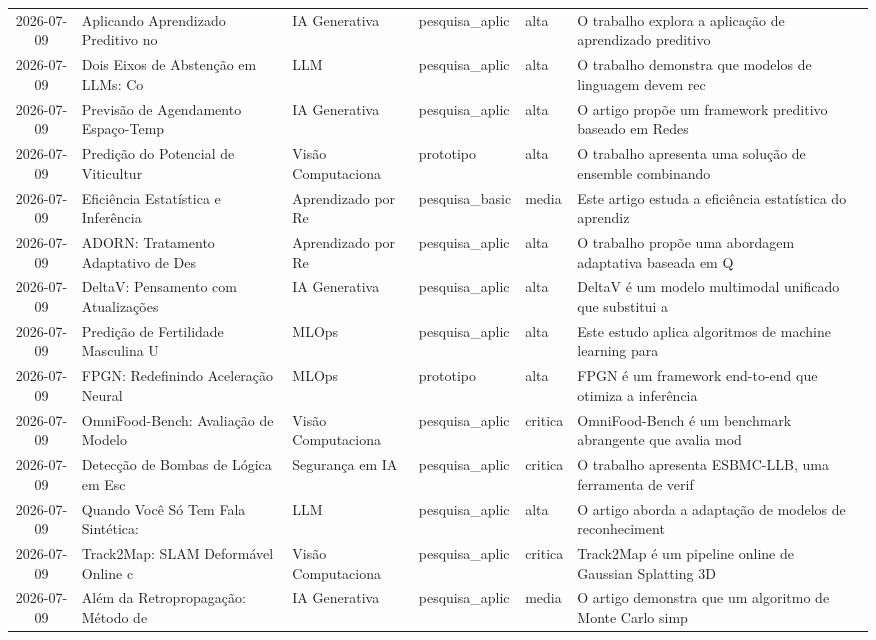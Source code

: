 \documentclass[
  brazilian,
  11pt,
  letterpaper,
  DIV=11,
  numbers=noendperiod]{scrartcl}
\begin{document}
\begin{table}
{\begin{threeparttable}
\begin{tabular}{cp{1.2cm}p{3.5cm}p{2cm}p{1.8cm}p{1.2cm}p{4cm}}
    2026-07-09 & Aplicando Aprendizado Preditivo no  & IA Generativa & pesquisa\_aplic & alta & O trabalho explora a aplicação de aprendizado preditivo \\
    2026-07-09 & Dois Eixos de Abstenção em LLMs: Co & LLM & pesquisa\_aplic & alta & O trabalho demonstra que modelos de linguagem devem rec \\
    2026-07-09 & Previsão de Agendamento Espaço-Temp & IA Generativa & pesquisa\_aplic & alta & O artigo propõe um framework preditivo baseado em Redes \\
    2026-07-09 & Predição do Potencial de Viticultur & Visão Computaciona & prototipo & alta & O trabalho apresenta uma solução de ensemble combinando \\
    2026-07-09 & Eficiência Estatística e Inferência & Aprendizado por Re & pesquisa\_basic & media & Este artigo estuda a eficiência estatística do aprendiz \\
    2026-07-09 & ADORN: Tratamento Adaptativo de Des & Aprendizado por Re & pesquisa\_aplic & alta & O trabalho propõe uma abordagem adaptativa baseada em Q \\
    2026-07-09 & DeltaV: Pensamento com Atualizações & IA Generativa & pesquisa\_aplic & alta & DeltaV é um modelo multimodal unificado que substitui a \\
    2026-07-09 & Predição de Fertilidade Masculina U & MLOps & pesquisa\_aplic & alta & Este estudo aplica algoritmos de machine learning para  \\
    2026-07-09 & FPGN: Redefinindo Aceleração Neural & MLOps & prototipo & alta & FPGN é um framework end-to-end que otimiza a inferência \\
    2026-07-09 & OmniFood-Bench: Avaliação de Modelo & Visão Computaciona & pesquisa\_aplic & critica & OmniFood-Bench é um benchmark abrangente que avalia mod \\
    2026-07-09 & Detecção de Bombas de Lógica em Esc & Segurança em IA & pesquisa\_aplic & critica & O trabalho apresenta ESBMC-LLB, uma ferramenta de verif \\
    2026-07-09 & Quando Você Só Tem Fala Sintética:  & LLM & pesquisa\_aplic & alta & O artigo aborda a adaptação de modelos de reconheciment \\
    2026-07-09 & Track2Map: SLAM Deformável Online c & Visão Computaciona & pesquisa\_aplic & critica & Track2Map é um pipeline online de Gaussian Splatting 3D \\
    2026-07-09 & Além da Retropropagação: Método de  & IA Generativa & pesquisa\_aplic & media & O artigo demonstra que um algoritmo de Monte Carlo simp \\

\end{tabular}
\end{threeparttable}}
\end{table}
\end{document}
